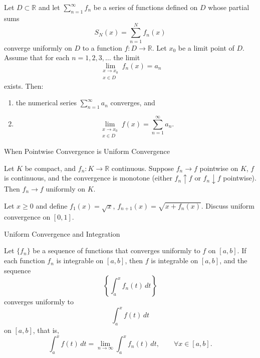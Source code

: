 \documentclass[12pt, a4paper]{article}
\begin{document}
\begin{theorem}
Let $D\subset\mathbb{R}$ and let $\sum_{n=1}^{\infty} f_n$ be a series of functions
defined on $D$ whose partial sums
\[
S_N(x)=\sum_{n=1}^{N} f_n(x)
\]
converge uniformly on $D$ to a function $f:D\to\mathbb{R}$.
Let $x_0$ be a limit point of $D$.
Assume that for each $n=1,2,3,\dots$ the limit
\[
\lim_{\substack{x\to x_0\\ x\in D}} f_n(x)=a_n
\]
exists. Then:
\begin{enumerate}
\item the numerical series $\displaystyle \sum_{n=1}^{\infty} a_n$ converges, and
\item
\[
\lim_{\substack{x\to x_0\\ x\in D}} f(x)=\sum_{n=1}^{\infty} a_n.
\]
\end{enumerate}
\end{theorem}



\clearpage

\begin{heading}
    When Pointwise Convergence is Uniform Convergence
\end{heading}

\vspace{10pt}

\begin{theorem}
Let $K$ be compact, and $f_n:K\to\mathbb{R}$ continuous. Suppose $f_n\to f$ pointwise on $K$,
$f$ is continuous, and the convergence is monotone (either $f_n\uparrow f$ or $f_n\downarrow f$ pointwise).
Then $f_n\to f$ uniformly on $K$.
\end{theorem}

\clearpage

\begin{problem}
    Let $x\ge 0$ and define $f_1(x)=\sqrt{x}$, $f_{n+1}(x)=\sqrt{x+f_n(x)}$.
Discuss uniform convergence on $[0,1]$.
\end{problem}

\clearpage

\begin{heading}
    Uniform Convergence and Integration
\end{heading}

\vspace{10pt}

\begin{theorem}
Let $\{f_n\}$ be a sequence of functions that converges uniformly to $f$ on $[a,b]$.
If each function $f_n$ is integrable on $[a,b]$, then $f$ is integrable on $[a,b]$,
and the sequence
\[
\left\{\int_a^x f_n(t)\,dt\right\}
\]
converges uniformly to
\[
\int_a^x f(t)\,dt
\]
on $[a,b]$, that is,
\[
\int_a^x f(t)\,dt
=
\lim_{n\to\infty}\int_a^x f_n(t)\,dt,
\qquad \forall x\in[a,b].
\]
\end{theorem}
\end{document}
